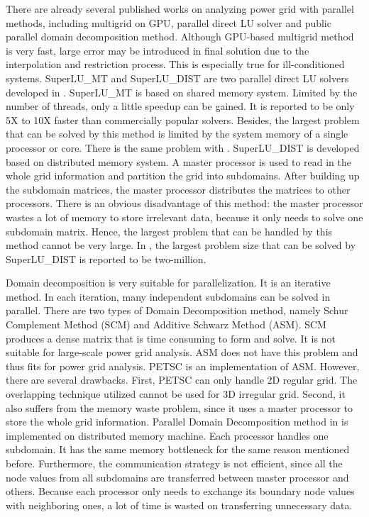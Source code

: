 \documentclass{sig-alternate}
\begin{document}
	There are already several published works on analyzing power grid with parallel methods, including multigrid on 
	GPU\cite{Zhuofeng}, parallel direct LU 
	solver\cite{Super_LU_website} and public parallel domain decomposition method\cite{PETSC_website, kaisun, voronov}. Although 
	GPU-based multigrid method\cite{Zhuofeng} is very fast, large error may be
	introduced in final solution due to the interpolation and restriction
	process. This is especially true for ill-conditioned systems. SuperLU\_MT and SuperLU\_DIST are two parallel direct LU 
	solvers developed in \cite{Super_LU_website}. SuperLU\_MT is 
	based on shared memory system. Limited by the number of threads, only a little speedup can be gained. 
	It is reported to be only 5X to 10X faster than commercially popular solvers\cite{Super_LU_website}. Besides, the largest 
	problem that can be solved by this method is limited by the system memory of a single processor or core. There is the same 
	problem with \cite{voronov}. SuperLU\_DIST 
	is developed based on distributed memory system. A master processor is used to read in the whole grid information and 
	partition the grid into
	subdomains. After building up the subdomain matrices, the master processor distributes the matrices to other processors. 
	There is an obvious disadvantage of this method: the master processor wastes a lot of memory to store irrelevant data, because 
	it only needs to solve one subdomain matrix. Hence, the largest problem that can be handled by this method cannot be very large. In 
	\cite{Super_LU_website}, the largest problem size that can be solved by SuperLU\_DIST is reported to be two-million.

	Domain decomposition is very suitable for parallelization. It is an iterative method. In each iteration, many independent 
	subdomains can be solved in parallel. There are two types of Domain Decomposition method, namely Schur Complement Method (SCM) 
	and Additive Schwarz Method (ASM). SCM produces a dense matrix that is time consuming to form and solve. It
	is not suitable for large-scale power grid analysis. ASM does not have this problem 
	and thus fits for power grid analysis. PETSC\cite{PETSC_website} is an implementation of ASM.
	However, there are several drawbacks. First, PETSC can only handle 2D regular grid. 
	The overlapping technique utilized cannot be used for 3D irregular grid. Second, it also suffers from the memory waste problem,
	since it uses a master processor to store the whole grid information. Parallel Domain Decomposition method in \cite{kaisun} is
	implemented on distributed memory machine. Each processor handles one subdomain. It has the same memory bottleneck for the 
	same reason mentioned before. Furthermore, the communication strategy is not efficient, since all 
	the node values from all subdomains are transferred between master processor and 
	others. Because each processor only needs to exchange its boundary node values with neighboring ones, a lot of time is 
	wasted on transferring unnecessary data. 
	
\end{document}
